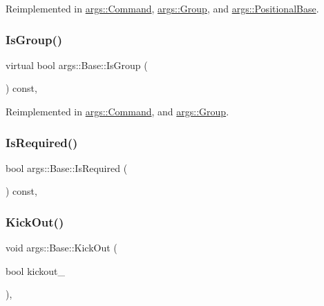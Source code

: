 Reimplemented in \hyperlink{classargs_1_1_command_a5c430c5f36d678e80420d2f094ac3a4d}{args\+::\+Command}, \hyperlink{classargs_1_1_group_a3d976f35f65ed8e4908eb88ce84accd4}{args\+::\+Group}, and \hyperlink{classargs_1_1_positional_base_ad730bb355966fa423046bef31015fbc3}{args\+::\+Positional\+Base}.

\mbox{\label{classargs_1_1_base_a72e11d38c82b8dca87b830853676b68c}} 
\subsubsection{\texorpdfstring{Is\+Group()}{IsGroup()}}
{\footnotesize\ttfamily virtual bool args\+::\+Base\+::\+Is\+Group (\begin{DoxyParamCaption}{ }\end{DoxyParamCaption}) const\hspace{0.3cm}{\ttfamily [inline]}, {\ttfamily [virtual]}}



Reimplemented in \hyperlink{classargs_1_1_command_acc75daa42b98b9be35718f072a46f13a}{args\+::\+Command}, and \hyperlink{classargs_1_1_group_a60de0a1db5be506a8638af0d3ce329bc}{args\+::\+Group}.

\mbox{\label{classargs_1_1_base_a3d705fcb8aa72e6f16a18e47dee12a62}} 
\subsubsection{\texorpdfstring{Is\+Required()}{IsRequired()}}
{\footnotesize\ttfamily bool args\+::\+Base\+::\+Is\+Required (\begin{DoxyParamCaption}{ }\end{DoxyParamCaption}) const\hspace{0.3cm}{\ttfamily [inline]}, {\ttfamily [noexcept]}}

\mbox{\label{classargs_1_1_base_a2a1d655c5d36c58fd19ca30d927d85b8}} 
\subsubsection{\texorpdfstring{Kick\+Out()}{KickOut()}\hspace{0.1cm}{\footnotesize\ttfamily [1/2]}}
{\footnotesize\ttfamily void args\+::\+Base\+::\+Kick\+Out (\begin{DoxyParamCaption}\item[{bool}]{kickout\+\_\+ }\end{DoxyParamCaption})\hspace{0.3cm}{\ttfamily [inline]}, {\ttfamily [noexcept]}}



